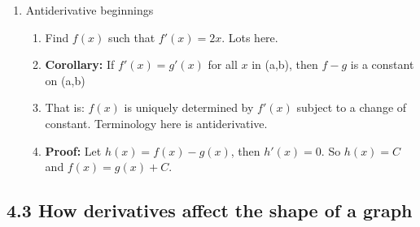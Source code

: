\documentclass{article}
\begin{document}
\begin{enumerate}
\item Antiderivative beginnings
\begin{enumerate}
\item Find $f(x)$ such that $f'(x) = 2x$. Lots here.
\item {\bf Corollary:} If $f'(x) = g'(x)$ for all $x$ in (a,b), then $f-g$ is a constant on (a,b)
\item That is: $f(x)$ is uniquely determined by $f'(x)$ subject to a change of constant. Terminology here is antiderivative.
\item {\bf Proof:} Let $h(x)=f(x)-g(x)$, then $h'(x)=0$. So $h(x)=C$ and $f(x)=g(x)+C$.
\end{enumerate}
\end{enumerate}


\subsection{4.3 How derivatives affect the shape of a graph}
\end{document}
